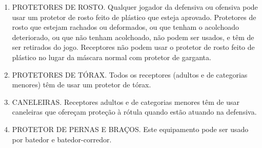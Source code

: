 \begin{multicols}{2}
\begin{enumerate}[label=\alph*)]
		O receptor n\~ao precisa usar o protetor de garganta quando sua m\'ascara j\'a vem dotada de um dispositivo fixo com essa finalidade. Receptores est\~ao autorizados a usar m\'ascara do tipo utilizado por goleiro de hockey sobre gelo. Se a m\'ascara n\~ao tiver um dispositivo fixo para proteger a garganta, o receptor ter\'a de anexar um acess\'orio que atenda a essa finalidade, antes de us\'a-la. 
		
		\item  PROTETORES DE ROSTO. Qualquer jogador da defensiva ou ofensiva pode usar um protetor de rosto feito de pl\'astico que esteja aprovado. Protetores de rosto que estejam rachados ou deformados, ou que tenham o acolchoado deteriorado, ou que n\~ao tenham acolchoado, n\~ao podem ser usados, e t\^em de ser retirados do jogo. 
		Receptores n\~ao podem usar o protetor de rosto feito de pl\'astico no lugar da m\'ascara normal com protetor de garganta. 
		
		\item  PROTETORES DE TÓRAX. Todos os receptores (adultos e de categorias menores) t\^em de usar um protetor de t\'orax.
		\item CANELEIRAS. Receptores adultos e de categorias menores t\^em de usar caneleiras que ofere\c{c}am prote\c{c}\~ao \`a r\'otula quando est\~ao atuando na defensiva. 
		
		\item  PROTETOR DE PERNAS E BRA\c{C}OS. Este equipamento pode ser usado por batedor e batedor-corredor. 
	\end{enumerate}
	\end{multicols}

